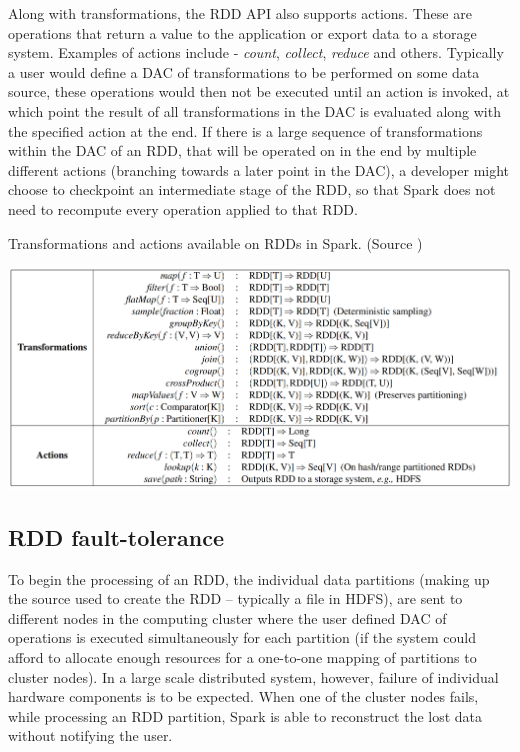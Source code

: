 \documentclass{l4proj}
\begin{document}
Along with transformations, the RDD API also supports actions. These are operations that return a value to the application or export data to a storage system. Examples of actions include - \textit{count}, \textit{collect}, \textit{reduce} and others. Typically a user would define a DAC of transformations to be performed on some data source, these operations would then not be executed until an action is invoked, at which point the result of all transformations in the DAC is evaluated along with the specified action at the end. If there is a large sequence of transformations within the DAC of an RDD, that will be operated on in the end by multiple different actions (branching towards a later point in the DAC), a developer might choose to checkpoint an intermediate stage of the RDD, so that Spark does not need to recompute every operation applied to that RDD.

\begin{table}[H]
\label{Actions and Transformations}
\caption{Transformations and actions available on RDDs in Spark. (Source \cite{RDD})}
\includegraphics[width=1.0\textwidth]{images/spark-trans-action}
\end{table}

\subsection{RDD fault-tolerance}

To begin the processing of an RDD, the individual data partitions (making up the source used to create the RDD -- typically a file in HDFS), are sent to different nodes in the computing cluster where the user defined DAC of operations is executed simultaneously for each partition (if the system could afford to allocate enough resources for a one-to-one mapping of partitions to cluster nodes). In a large scale distributed system, however, failure of individual hardware components is to be expected. When one of the cluster nodes fails, while processing an RDD partition, Spark is able to reconstruct the lost data without notifying the user.
\end{document}
